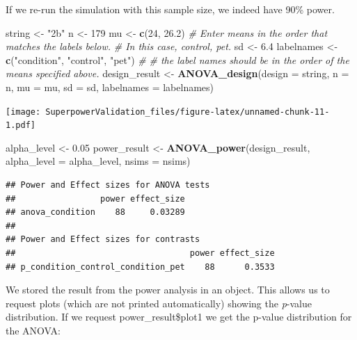 \documentclass[]{book}
\newenvironment{Shaded}{\begin{snugshade}}{\end{snugshade}}
\newcommand{\CommentTok}[1]{\textcolor[rgb]{0.56,0.35,0.01}{\textit{#1}}}
\newcommand{\DataTypeTok}[1]{\textcolor[rgb]{0.13,0.29,0.53}{#1}}
\newcommand{\DecValTok}[1]{\textcolor[rgb]{0.00,0.00,0.81}{#1}}
\newcommand{\FloatTok}[1]{\textcolor[rgb]{0.00,0.00,0.81}{#1}}
\newcommand{\KeywordTok}[1]{\textcolor[rgb]{0.13,0.29,0.53}{\textbf{#1}}}
\newcommand{\NormalTok}[1]{#1}
\newcommand{\StringTok}[1]{\textcolor[rgb]{0.31,0.60,0.02}{#1}}
\begin{document}
If we re-run the simulation with this sample size, we indeed have 90\% power.

\begin{Shaded}
\begin{Highlighting}[]
\NormalTok{string <-}\StringTok{ "2b"}
\NormalTok{n <-}\StringTok{ }\DecValTok{179}
\NormalTok{mu <-}\StringTok{ }\KeywordTok{c}\NormalTok{(}\DecValTok{24}\NormalTok{, }\FloatTok{26.2}\NormalTok{)}
\CommentTok{# Enter means in the order that matches the labels below.}
\CommentTok{# In this case, control, pet. }
\NormalTok{sd <-}\StringTok{ }\FloatTok{6.4}
\NormalTok{labelnames <-}\StringTok{ }\KeywordTok{c}\NormalTok{(}\StringTok{"condition"}\NormalTok{, }\StringTok{"control"}\NormalTok{, }\StringTok{"pet"}\NormalTok{) }\CommentTok{#}
\CommentTok{# the label names should be in the order of the means specified above.}
\NormalTok{design_result <-}\StringTok{ }\KeywordTok{ANOVA_design}\NormalTok{(}\DataTypeTok{design =}\NormalTok{ string,}
                   \DataTypeTok{n =}\NormalTok{ n, }
                   \DataTypeTok{mu =}\NormalTok{ mu, }
                   \DataTypeTok{sd =}\NormalTok{ sd, }
                   \DataTypeTok{labelnames =}\NormalTok{ labelnames)}
\end{Highlighting}
\end{Shaded}

\texttt{[image: SuperpowerValidation\_files/figure-latex/unnamed-chunk-11-1.pdf]}

\begin{Shaded}
\begin{Highlighting}[]
\NormalTok{alpha_level <-}\StringTok{ }\FloatTok{0.05}
\NormalTok{power_result <-}\StringTok{ }\KeywordTok{ANOVA_power}\NormalTok{(design_result, }\DataTypeTok{alpha_level =}\NormalTok{ alpha_level, }\DataTypeTok{nsims =}\NormalTok{ nsims)}
\end{Highlighting}
\end{Shaded}

\begin{verbatim}
## Power and Effect sizes for ANOVA tests
##                 power effect_size
## anova_condition    88     0.03289
## 
## Power and Effect sizes for contrasts
##                                   power effect_size
## p_condition_control_condition_pet    88      0.3533
\end{verbatim}

We stored the result from the power analysis in an object. This allows us to request plots (which are not printed automatically) showing the \emph{p}-value distribution. If we request power\_result\$plot1 we get the p-value distribution for the ANOVA:
\end{document}
